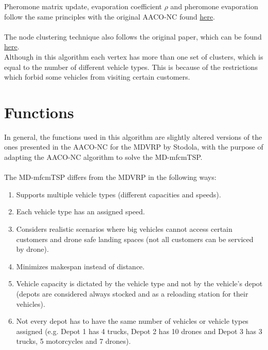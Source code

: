 \documentclass[twocolumn]{article}
\begin{document}
	Pheromone matrix update, evaporation coefficient $\rho$ and pheromone evaporation follow the same principles with the original AACO-NC found \href{https://ieeexplore.ieee.org/abstract/document/9991848}{here}.\\\\
	The node clustering technique also follows the original paper, which can be found 
	\href{https://www.inderscienceonline.com/doi/abs/10.1504/IJBIC.2016.078639}{here}.\\
	Although in this algorithm each vertex has more than one set of clusters, which is equal to the number of different vehicle types. This is because of the restrictions which forbid some vehicles from visiting certain customers.
	
	
	\section{Functions}
	
	In general, the functions used in this algorithm are slightly altered versions of the ones presented in the AACO-NC for the MDVRP by Stodola, with the purpose of adapting the AACO-NC algorithm to solve the MD-mfcmTSP.\\\\
	The MD-mfcmTSP differs from the MDVRP in the following ways:\\
	\begin{enumerate}
		\item Supports multiple vehicle types (different capacities and speeds).\
		\item Each vehicle type has an assigned speed.\
		\item Considers realistic scenarios where big vehicles cannot access certain customers and drone safe landing spaces (not all customers can be serviced by drone).\
		\item Minimizes makespan instead of distance.\
		\item Vehicle capacity is dictated by the vehicle type and not by the vehicle's depot (depots are considered always stocked and as a reloading station for their vehicles).\
		\item Not every depot has to have the same number of vehicles or vehicle types assigned (e.g. Depot 1 has 4 trucks, Depot 2 has 10 drones and Depot 3 has 3 trucks, 5 motorcycles and 7 drones).\
		
	\end{enumerate}

	\
	\
	\
	\
	\
	\
	\
	\
	
	
	\newpage
	
\end{document}
